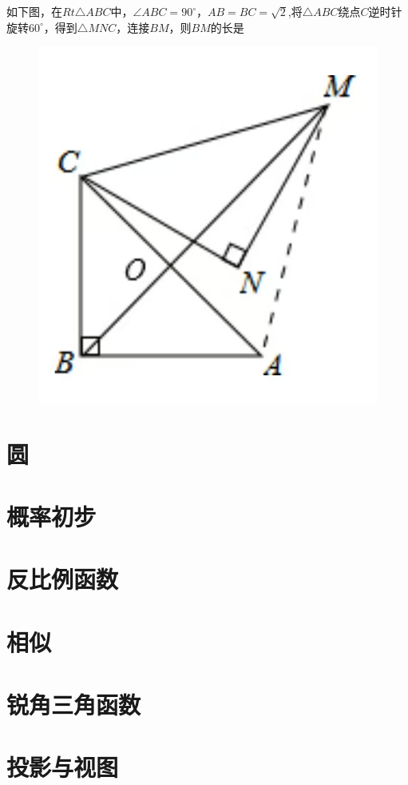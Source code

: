 \documentclass[lang=cn, 10pt, titlestyle=hang]{elegantbook}
\begin{document}
\begin{example}
    如下图，在\(Rt\triangle ABC \)中，\(\angle ABC = 90^\circ \)，\(AB=BC=\sqrt{2}\),将\(\triangle ABC\)绕点\(C\)逆时针旋转\(60^\circ\)，得到\(\triangle MNC\)，连接\(BM\)，则\(BM\)的长是 \underline{\hspace{3em}}
    
\begin{figure}[h]
    \raggedright
    \includegraphics[width=0.25\linewidth]{figure/example_rotation1.jpg}
    
    \label{fig:enter-label}
\end{figure}
    
\end{example}



\chapter{圆}

\chapter{概率初步}

\chapter{反比例函数}

\chapter{相似}

\chapter{锐角三角函数}

\chapter{投影与视图}
\end{document}
